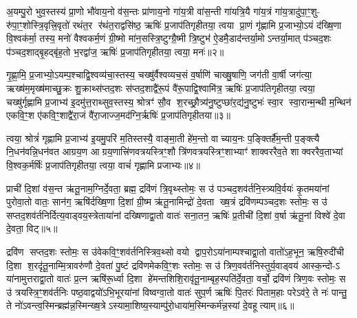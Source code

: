 {\anuvakamend[{योनौ॒ पञ्च॑दश च॥१॥}]}

अ॒यम्पु॒रो भुव॒स्तस्य॑ प्रा॒णो भौ॑वाय॒नो व॑स॒न्तः प्रा॑णाय॒नो गा॑य॒त्री वा॑स॒न्ती गा॑यत्रि॒यै गा॑य॒त्रं गा॑य॒त्रादु॑पा॒ꣳ॒शु- रु॑पा॒ꣳ॒शोस्त्रि॒वृत्त्रि॒वृतो॑ रथंत॒र र॑थंत॒राद्वसि॑ष्ठ॒ ऋषिः॑ प्र॒जाप॑तिगृहीतया॒ त्वया प्रा॒णं गृ॑ह्णामि प्र॒जाभ्यो॒ऽयं द॑ख्षि॒णा वि॒श्वक॑र्मा॒ तस्य॒ मनो॑ वैश्वकर्म॒णं ग्री॒ष्मो मा॑न॒सस्त्रि॒ष्टुग्ग्रै॒ष्मी त्रि॒ष्टुभ॑ ऐ॒डमै॒डाद॑न्तर्या॒मोऽन्तर्या॒मात् प॑ञ्चद॒शः प॑ञ्चद॒शाद्बृ॒हद्बृ॑ह॒तो भ॒रद्वा॑ज॒ ऋषिः॑ प्र॒जाप॑तिगृहीतया॒ त्वया॒ मनः॑॥२॥

गृ॒ह्णा॒मि॒ प्र॒जाभ्यो॒ऽयम्प॒श्चाद्वि॒श्वव्य॑चा॒स्तस्य॒ चख्षु॑र्वैश्वव्यच॒सं व॒र्\mbox{}षाणि॑ चाख्षु॒षाणि॒ जग॑ती वा॒र्\mbox{}षी जग॑त्या॒ ऋख्ष॑म॒मृख्ष॑माच्छु॒क्रः शु॒क्राथ्स॑प्तद॒शः स॑प्तद॒शाद्वै॑रू॒पं वै॑रू॒पाद्वि॒श्वामि॑त्र॒ ऋषिः॑ प्र॒जाप॑तिगृहीतया॒ त्वया॒ चख्षु॑र्गृह्णामि प्र॒जाभ्य॑ इ॒दमु॑त्त॒राथ्सुव॒स्तस्य॒ श्रोत्रꣳ॑ सौ॒व श॒रच्छ्रौ॒त्र्य॑नु॒ष्टुप्छा॑र॒द्य॑नु॒ष्टुभः॑ स्वा॒र स्वा॒रान्म॒न्थी म॒न्थिन॑ एकवि॒ꣳ॒श ए॑कवि॒ꣳ॒शाद्वै॑रा॒जं वै॑रा॒जाज्ज॒मद॑ग्नि॒र्\mbox{}ऋषिः॑ प्र॒जाप॑तिगृहीतया॥३॥

त्वया॒ श्रोत्रं॑ गृह्णामि प्र॒जाभ्य॑ इ॒यमु॒परि॑ म॒तिस्तस्यै॒ वाङ्मा॒ती हे॑म॒न्तो वाच्याय॒नः प॒ङ्क्तिर्\mbox{}है॑म॒न्ती प॒ङ्क्त्यै नि॒धन॑वन्नि॒धन॑वत आग्रय॒ण आग्रय॒णात्त्रि॑णवत्रयस्त्रिꣳ॒शौ त्रि॑णवत्रयस्त्रिꣳ॒शाभ्याꣳ॑ शाक्वररैव॒ते शाक्वररैव॒ताभ्यां वि॒श्वक॒र्मर्\mbox{}षिः॑ प्र॒जाप॑तिगृहीतया॒ त्वया॒ वाचं॑ गृह्णामि प्रजाभ्यः॥४॥

{\anuvakamend[{त्वया॒ मनो॑ ज॒मद॑ग्नि॒र्\mbox{}ऋषिः॑ प्र॒जाप॑तिगृहीतया त्रि॒ꣳ॒शच्च॑॥२॥}]}

प्राची॑ दि॒शां व॑स॒न्त ऋ॑तू॒नाम॒ग्निर्दे॒वता॒ ब्रह्म॒ द्रवि॑णं त्रि॒वृथ्स्तोमः॒ स उ॑ पञ्चद॒शव॑र्तनि॒स्त्र्यवि॒र्वयः॑ कृ॒तमया॑नां पुरोवा॒तो वातः॒ सान॑ग॒ ऋषि॑र्दख्षि॒णा दि॒शां ग्री॒ष्म ऋ॑तू॒नामिन्द्रो॑ दे॒वता ख्ष॒त्रं द्रवि॑णम्पञ्चद॒शः स्तोमः॒ स उ॑ सप्तद॒शव॑र्तनिर्दित्य॒वाड्वय॒स्त्रेताया॑नां दख्षिणाद्वा॒तो वातः॑ सना॒तन॒ ऋषिः॑ प्र॒तीची॑ दि॒शां व॒र्\mbox{}षा ऋ॑तू॒नां विश्वे॑ दे॒वा दे॒वता॒ विट्॥५॥

द्रवि॑ण सप्तद॒शः स्तोमः॒ स उ॑वेकवि॒ꣳ॒शव॑र्तनिस्त्रिव॒थ्सो वयो द्वाप॒रोऽया॑नाम्पश्चाद्वा॒तो वातो॑ऽह॒भून॒ ऋषि॒रुदी॑ची दि॒शा श॒रदृ॑तू॒नाम्मि॒त्रावरु॑णौ दे॒वता॑ पु॒ष्टं द्रवि॑णमेकवि॒ꣳ॒शः स्तोमः॒ स उ॑ त्रिण॒वव॑र्तनिस्तुर्य॒वाड्वय॑ आस्क॒न्दो-ऽ या॑नामुत्तराद्वा॒तो वातः॑ प्र॒त्न ऋषि॑रू॒र्ध्वा दि॒शा हे॑मन्तशिशि॒रावृ॑तू॒नाम्बृह॒स्पति॑र्दे॒वता॒ वर्चो॒ द्रवि॑णं त्रिण॒वः स्तोमः॒ स उ॑ त्रयस्त्रि॒ꣳ॒शव॑र्तनिः पष्ठ॒वाद्वयो॑ऽभि॒भूरया॑नां विष्वग्वा॒तो वातः॑ सुप॒र्ण ऋषिः॑ पि॒तरः॑ पिताम॒हाः परेऽव॑रे॒ ते नः॑ पान्तु॒ ते नो॑ऽवन्त्व॒स्मिन्ब्रह्म॑न्न॒स्मिन्ख्ष॒त्रेऽस्यामा॒शिष्य॒स्याम्पु॑रो॒धाया॑म॒स्मिन्कर्म॑न्न॒स्यां दे॒वहूत्याम्॥६॥

